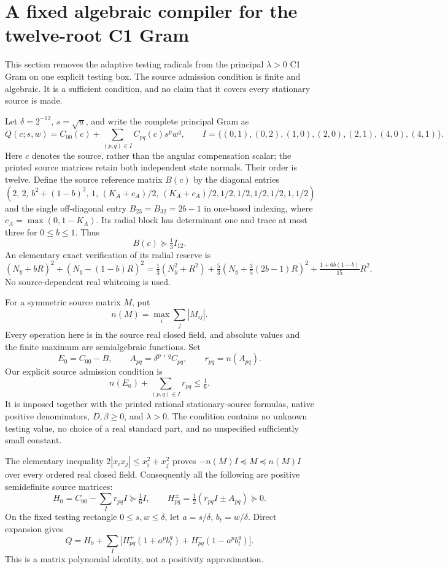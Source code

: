 \section{A fixed algebraic compiler for the twelve-root C1 Gram}
\label{sec:fixed-principal}
This section removes the adaptive testing radicals from the principal
$\lambda>0$ C1 Gram on one explicit testing box. The source admission
condition is finite and algebraic. It is a sufficient condition, and no
claim that it covers every stationary source is made.

Let $\delta=2^{-12}$, $s=\sqrt u$, and write the complete principal Gram
as
\[
 Q(c;s,w)=C_{00}(c)+\sum_{(p,q)\in I} C_{pq}(c)s^pw^q,
 \qquad
 I=\{(0,1),(0,2),(1,0),(2,0),(2,1),(4,0),(4,1)\}.
\]
Here $c$ denotes the source, rather than the angular compensation
scalar; the printed source matrices retain both independent state
normals. Their order is twelve. Define the source reference matrix
$B(c)$ by the diagonal entries
\[
 (2,\,2,\,b^2+(1-b)^2,\,1,\,(K_A+c_A)/2,\,(K_A+c_A)/2,
       1/2,1/2,1/2,1/2,1,1/2)
\]
and the single off-diagonal entry $B_{23}=B_{32}=2b-1$ in one-based
indexing, where $c_A=\max(0,1-K_A)$. Its radial block has determinant
one and trace at most three for $0\le b\le1$. Thus
\[
 B(c)\succeq\tfrac13I_{12}.
\]
An elementary exact verification of its radial reserve is
\[
 (N_y+bR)^2+(N_y-(1-b)R)^2
 =\tfrac13(N_y^2+R^2)
 +\tfrac53\left(N_y+\tfrac35(2b-1)R\right)^2
 +\tfrac{1+6b(1-b)}{15}R^2.
\]
No source-dependent real whitening is used.

For a symmetric source matrix $M$, put
\[
 n(M)=\max_i\sum_j|M_{ij}|.
\]
Every operation here is in the source real closed field, and absolute
values and the finite maximum are semialgebraic functions. Set
\[
 E_0=C_{00}-B,\qquad
 A_{pq}=\delta^{p+q}C_{pq},\qquad r_{pq}=n(A_{pq}).
\]
Our explicit source admission condition is
\begin{equation}\label{eq:finite-admission}
 n(E_0)+\sum_{(p,q)\in I}r_{pq}\le\tfrac16.
\end{equation}
It is imposed together with the printed rational stationary-source
formulas, native positive denominators, $D,\beta\ge0$, and $\lambda>0$.
The condition contains no unknown testing value, no choice of a real
standard part, and no unspecified sufficiently small constant.

The elementary inequality
$2|x_ix_j|\le x_i^2+x_j^2$ proves
$-n(M)I\preceq M\preceq n(M)I$ over every ordered real closed field.
Consequently all the following are positive semidefinite source matrices:
\[
 H_0=C_{00}-\sum_I r_{pq}I\succeq\tfrac16I,
 \qquad H_{pq}^{\pm}=\tfrac12(r_{pq}I\pm A_{pq})\succeq0.
\]
On the fixed testing rectangle $0\le s,w\le\delta$, let
$a=s/\delta$, $b_t=w/\delta$. Direct expansion gives
\begin{equation}\label{eq:fixed-matrix-split}
 Q=H_0+\sum_I\bigl[H_{pq}^+(1+a^pb_t^q)
                         +H_{pq}^-(1-a^pb_t^q)\bigr].
\end{equation}
This is a matrix polynomial identity, not a positivity approximation.


